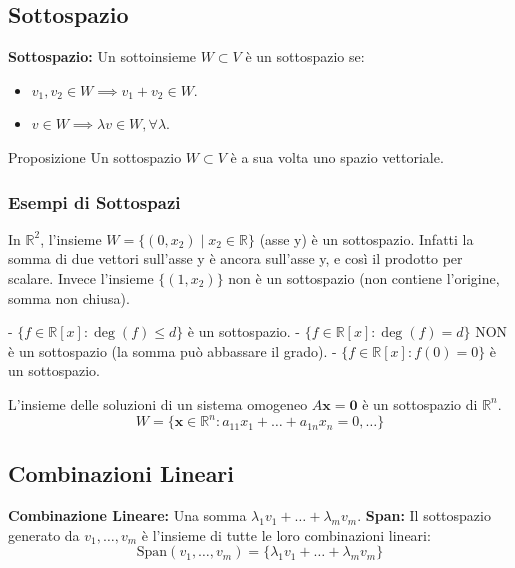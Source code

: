 \subsection{Sottospazio}
\begin{definitionbox}
\textbf{Sottospazio:} Un sottoinsieme $W \subset V$ è un sottospazio se:
\begin{itemize}
    \item $v_1, v_2 \in W \implies v_1 + v_2 \in W$.
    \item $v \in W \implies \lambda v \in W, \forall \lambda$.
\end{itemize}
\end{definitionbox}

\begin{concept}{Proposizione}
Un sottospazio $W \subset V$ è a sua volta uno spazio vettoriale.
\end{concept}

\subsubsection{Esempi di Sottospazi}

\begin{exercisebox}[title={Esempio 1}]
In $\mathbb{R}^2$, l'insieme $W = \{ (0, x_2) \mid x_2 \in \mathbb{R} \}$ (asse y) è un sottospazio.
Infatti la somma di due vettori sull'asse y è ancora sull'asse y, e così il prodotto per scalare.
Invece l'insieme $\{ (1, x_2) \}$ non è un sottospazio (non contiene l'origine, somma non chiusa).
\end{exercisebox}

\begin{exercisebox}[title={Esempio 2 (Polinomi)}]
- $\{ f \in \mathbb{R}[x] : \deg(f) \le d \}$ è un sottospazio.
- $\{ f \in \mathbb{R}[x] : \deg(f) = d \}$ NON è un sottospazio (la somma può abbassare il grado).
- $\{ f \in \mathbb{R}[x] : f(0) = 0 \}$ è un sottospazio.
\end{exercisebox}

\begin{exercisebox}[title={Esempio 3 (Soluzioni Sistemi)}]
L'insieme delle soluzioni di un sistema omogeneo $A\mathbf{x} = \mathbf{0}$ è un sottospazio di $\mathbb{R}^n$.
$$ W = \{ \mathbf{x} \in \mathbb{R}^n : a_{11}x_1 + \dots + a_{1n}x_n = 0, \dots \} $$
\end{exercisebox}

\subsection{Combinazioni Lineari}
\begin{definitionbox}
\textbf{Combinazione Lineare:} Una somma $\lambda_1 v_1 + \dots + \lambda_m v_m$.
\textbf{Span:} Il sottospazio generato da $v_1, \dots, v_m$ è l'insieme di tutte le loro combinazioni lineari:
$$ \text{Span}(v_1, \dots, v_m) = \{ \lambda_1 v_1 + \dots + \lambda_m v_m \} $$
\end{definitionbox}

